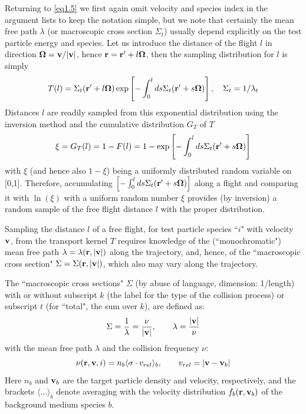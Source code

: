 Returning to \cref{eq1.5} we first  again omit velocity and species index in
the argument lists to keep the notation simple, but we note that certainly the
mean free path $\lambda$ (or macroscopic cross section $\Sigma_t$) usually
depend explicitly on the test particle energy and species.
Let us introduce the distance of the flight $l$ in direction
$\mathbf{\Omega}=\mathbf{v}/|\mathbf{v}|$, hence $\mathbf{r}=\mathbf{r}'+l\mathbf{\Omega}$, then the sampling distribution
for $l$ is simply
\begin{equation}
  T(l)=\Sigma_t(\mathbf{r}'+l\mathbf{\Omega})\exp\left[-\int_0^l ds
    \Sigma_t(\mathbf{r}'+s\mathbf{\Omega})\right], \quad \Sigma_t=1/\lambda_t
\end{equation}
Distances $l$ are readily sampled from this exponential distribution using the
inversion method and the cumulative distribution $G_T$ of $T$
\begin{equation}
  \label{cummul} \xi=G_T(l)=1-F(l)=1-\exp\left[-\int_0^l ds
    \Sigma_t(\mathbf{r}'+s\mathbf{\Omega})\right]
\end{equation}
with $\xi$ (and hence also
$1-\xi$) being a uniformly distributed	random variable on [0,1].
Therefore, accumulating $\left[-\int_0^l ds \Sigma_t(\mathbf{r}'+s\mathbf{\Omega})\right]$
along a flight and comparing it with $\ln(\xi)$ with a uniform random number
$\xi$ provides (by inversion) a random sample of the free flight distance $l$
with the proper distribution.

Sampling the distance $l$ of a free flight, for test particle species ``$i$"
with velocity $\mathbf{v}$, from the transport kernel $T$ requires knowledge of the
(``monochromatic") mean free path $\lambda = \lambda(\mathbf{r},|\mathbf{v}|)$ along the
trajectory, and, hence, of the ``macroscopic cross section" $\Sigma =
  \Sigma(\mathbf{r},|\mathbf{v}|)$, which also may vary along the trajectory.

The ``macroscopic cross sections" $\Sigma$ (by abuse of language, dimension:
1/length) with or without subscript $k$ (the label for the type of the
collision process) or subscript $t$ (for ``total", the sum over $k$), are
defined as:
\begin{equation}
  \Sigma = \frac{1}{\lambda} = \frac{\nu}{|\mathbf{v}|}, \qquad
  \lambda = \frac{|\mathbf{v}|}{\nu}
\end{equation}
with the mean free path $\lambda$ and the collision frequency
$\nu$:
\begin{equation}
  \nu(\mathbf{r},\mathbf{v},i) = n_b \langle\sigma \cdot
  v_{rel}\rangle_b, \qquad v_{rel}= |\mathbf{v}-\mathbf{v}_b|
\end{equation}
Here $n_b$ and $\mathbf{v}_b$ are the target particle density and velocity,
respectively, and the brackets $\langle\dots\rangle_b$ denote averaging with
the velocity distribution $f_b(\mathbf{r},\mathbf{v}_b)$ of the background medium species
$b$.

